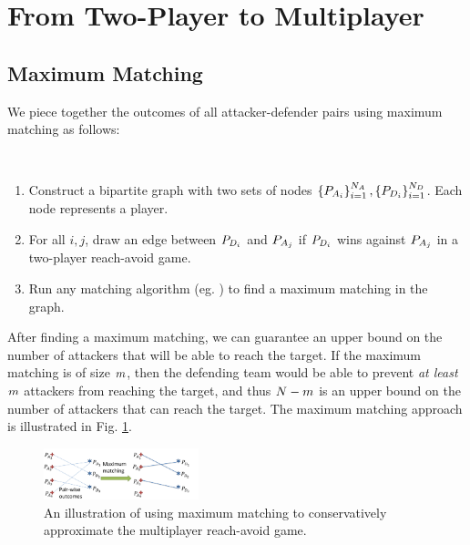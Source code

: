 \section{From Two-Player to Multiplayer} \label{sec:two_to_multi}

\subsection{Maximum Matching}
\label{subsec:max_match}
We piece together the outcomes of all attacker-defender pairs using maximum matching as follows:

\begin{alg}~
\begin{enumerate}
\item Construct a bipartite graph with two sets of nodes $\left\{P_{A_{i}}\right\}_{i=1}^{N_A},\left\{P_{D_{i}}\right\}_{i=1}^{N_D}$. Each node represents a player.
\item For all $i,j$, draw an edge between $P_{D_{i}}$ and $P_{A_{j}}$ if $P_{D_{i}}$ wins against $P_{A_{j}}$ in a two-player reach-avoid game.
\item Run any matching algorithm (eg. \cite{Schrjiver2004, Karpinski1998}) to find a maximum matching in the graph. %
\end{enumerate}
\end{alg}

After finding a maximum matching, we can guarantee an upper bound on the number of attackers that will be able to reach the target. If the maximum matching is of size $m$, then the defending team would be able to prevent \textit{at least} $m$ attackers from reaching the target, and thus $N-m$ is an upper bound on the number of attackers that can reach the target. The maximum matching approach is illustrated in Fig. \ref{fig:general_procedure}.

\begin{figure}
\centering
\includegraphics[width=0.4\textwidth]{"fig/general procedure"}
\caption{An illustration of using maximum matching to conservatively approximate the multiplayer reach-avoid game.}
\label{fig:general_procedure}
\end{figure}

